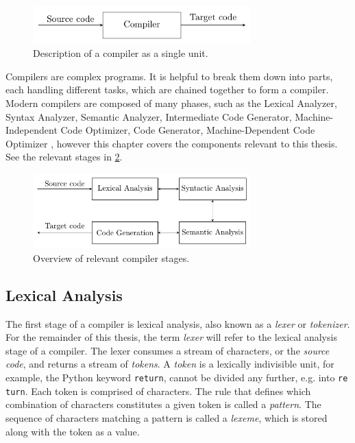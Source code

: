 \begin{figure}[H]
  \label{fig:compiler}
  \centering
  \includegraphics[width=0.75\textwidth]{figures/compiler.pdf}
  \caption{Description of a compiler as a single unit.}
\end{figure}



Compilers are complex programs. It is helpful to break them down into parts, each handling different tasks, which are chained together to form a compiler. Modern compilers are composed of many phases, such as the Lexical Analyzer, Syntax Analyzer, Semantic Analyzer, Intermediate Code Generator, Machine-Independent Code Optimizer, Code Generator, Machine-Dependent Code Optimizer \cite[p. 5]{dragon}, however this chapter covers the components relevant to this thesis. See the relevant stages in \cref{fig:compiler-stages}.


\begin{figure}[H]
 
  \label{fig:compiler-stages}
  \centering
  \includegraphics[width=0.75\textwidth]{figures/compiler-stages.pdf}
  \caption{Overview of relevant compiler stages.}
\end{figure}

\subsection*{Lexical Analysis}
The first stage of a compiler is lexical analysis, also known as a \emph{lexer} or \emph{tokenizer}. For the remainder of this thesis, the term \emph{lexer} will refer to the lexical analysis stage of a compiler. The lexer consumes a stream of characters, or the \emph{source code}, and returns a stream of \emph{tokens}. A \emph{token} is a lexically indivisible unit, for example, the Python keyword \texttt{return}, cannot be divided any further, e.g. into \texttt{re} \texttt{turn}. Each token is comprised of characters. The rule that defines which combination of characters constitutes a given token is called a \emph{pattern}. The sequence of characters matching a pattern is called a \emph{lexeme}, which is stored along with the token as a value.

